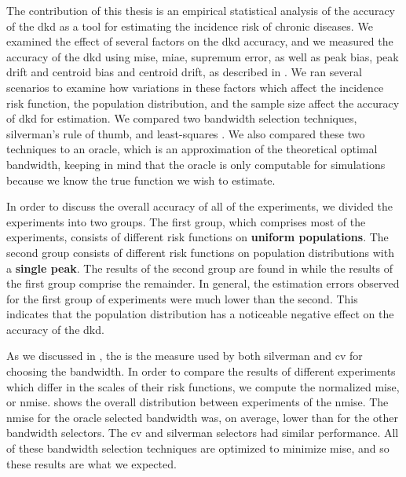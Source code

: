 

The contribution of this thesis is an empirical statistical analysis of the accuracy of the \gls{dkd}
as a tool for estimating the incidence risk of chronic diseases.
We examined the effect of several factors on the \gls{dkd} accuracy,
and we measured the accuracy of the \gls{dkd} using \gls{mise},
\gls{miae}, \gls{supremum error}, as well as \gls{peak bias}, \gls{peak drift} and \gls{centroid bias} and \gls{centroid drift},
as described in .
We ran several scenarios to examine how variations in these factors which affect the incidence risk function,
the population distribution, and the sample size affect the accuracy of \gls{dkd} for estimation.
We compared two bandwidth selection techniques, \gls{silverman}'s rule of thumb,
and least-squares .
We also compared these two techniques to an \gls{oracle},
which is an approximation of the theoretical optimal bandwidth,
keeping in mind that the oracle is only computable for simulations because we know the true function we wish to estimate.

In order to discuss the overall accuracy of all of the experiments,
we divided the experiments into two groups.
The first group, which comprises most of the experiments,
consists of different \gls{risk} functions on \textbf{uniform populations}.
The second group consists of different \gls{risk} functions on population distributions with a \textbf{single peak}.
The results of the second group are found in  while the results of the first group comprise the remainder.
In general, the estimation errors observed for the first group of experiments were much lower than the second.
This indicates that the population distribution has a noticeable negative effect on the accuracy of the \gls{dkd}.

As we discussed in ,
the  is the measure used by both \gls{silverman} and \gls{cv} for choosing the bandwidth.
In order to compare the results of different experiments which differ in the scales of their \gls{risk} functions,
we compute the normalized \gls{mise}, or \gls{nmise}. 
 shows the overall distribution between experiments of the \gls{nmise}.
The \gls{nmise} for the \gls{oracle} selected bandwidth was, on average,
lower than for the other bandwidth selectors.
The \gls{cv} and \gls{silverman} selectors had similar performance.
All of these bandwidth selection techniques are optimized to minimize \gls{mise},
and so these results are what we expected.

